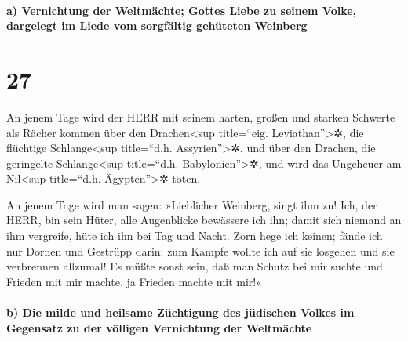 \hypertarget{a-vernichtung-der-weltmuxe4chte-gottes-liebe-zu-seinem-volke-dargelegt-im-liede-vom-sorgfuxe4ltig-gehuxfcteten-weinberg}{%
\paragraph{a) Vernichtung der Weltmächte; Gottes Liebe zu seinem Volke,
dargelegt im Liede vom sorgfältig gehüteten
Weinberg}\label{a-vernichtung-der-weltmuxe4chte-gottes-liebe-zu-seinem-volke-dargelegt-im-liede-vom-sorgfuxe4ltig-gehuxfcteten-weinberg}}

\hypertarget{section-26}{%
\section{27}\label{section-26}}

An jenem Tage wird der HERR mit seinem harten, großen und
starken Schwerte als Rächer kommen über den Drachen\textless sup
title=``eig. Leviathan''\textgreater✲, die flüchtige
Schlange\textless sup title=``d.h. Assyrien''\textgreater✲, und über den
Drachen, die geringelte Schlange\textless sup title=``d.h.
Babylonien''\textgreater✲, und wird das Ungeheuer am Nil\textless sup
title=``d.h. Ägypten''\textgreater✲ töten.

An jenem Tage wird man sagen: »Lieblicher Weinberg, singt
ihm zu! Ich, der HERR, bin sein Hüter, alle Augenblicke
bewässere ich ihn; damit sich niemand an ihm vergreife, hüte ich ihn bei
Tag und Nacht. Zorn hege ich keinen; fände ich nur Dornen
und Gestrüpp darin: zum Kampfe wollte ich auf sie losgehen und sie
verbrennen allzumal! Es müßte sonst sein, daß man Schutz
bei mir suchte und Frieden mit mir machte, ja Frieden machte mit mir!«

\hypertarget{b-die-milde-und-heilsame-zuxfcchtigung-des-juxfcdischen-volkes-im-gegensatz-zu-der-vuxf6lligen-vernichtung-der-weltmuxe4chte}{%
\paragraph{b) Die milde und heilsame Züchtigung des jüdischen Volkes im
Gegensatz zu der völligen Vernichtung der
Weltmächte}\label{b-die-milde-und-heilsame-zuxfcchtigung-des-juxfcdischen-volkes-im-gegensatz-zu-der-vuxf6lligen-vernichtung-der-weltmuxe4chte}}

